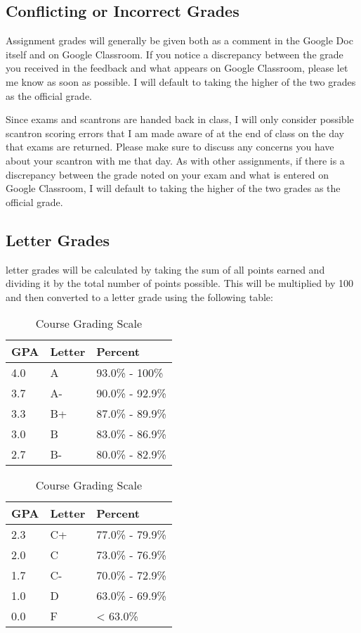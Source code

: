 \documentclass[]{book}
\begin{document}
\hypertarget{conflicting-or-incorrect-grades}{%
\subsection{Conflicting or Incorrect Grades}\label{conflicting-or-incorrect-grades}}

Assignment grades will generally be given both as a comment in the Google Doc itself and on Google Classroom. If you notice a discrepancy between the grade you received in the feedback and what appears on Google Classroom, please let me know as soon as possible. I will default to taking the higher of the two grades as the official grade.

Since exams and scantrons are handed back in class, I will only consider possible scantron scoring errors that I am made aware of at the end of class on the day that exams are returned. Please make sure to discuss any concerns you have about your scantron with me that day. As with other assignments, if there is a discrepancy between the grade noted on your exam and what is entered on Google Classroom, I will default to taking the higher of the two grades as the official grade.

\hypertarget{letter-grades}{%
\subsection{Letter Grades}\label{letter-grades}}

letter grades will be calculated by taking the sum of all points earned and dividing it by the total number of points possible. This will be multiplied by 100 and then converted to a letter grade using the following table:

\begin{table}
\caption{\label{tab:unnamed-chunk-7}Course Grading Scale}

\centering
\begin{tabular}{lll}
\toprule
GPA & Letter & Percent\\
\midrule
4.0 & A & 93.0\% - 100\%\\
3.7 & A- & 90.0\% - 92.9\%\\
3.3 & B+ & 87.0\% - 89.9\%\\
3.0 & B & 83.0\% - 86.9\%\\
2.7 & B- & 80.0\% - 82.9\%\\
\bottomrule
\end{tabular}
\centering
\begin{tabular}{lll}
\toprule
GPA & Letter & Percent\\
\midrule
2.3 & C+ & 77.0\% - 79.9\%\\
2.0 & C & 73.0\% - 76.9\%\\
1.7 & C- & 70.0\% - 72.9\%\\
1.0 & D & 63.0\% - 69.9\%\\
0.0 & F & < 63.0\%\\
\bottomrule
\end{tabular}
\end{table}
\end{document}
